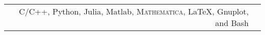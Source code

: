 \renewcommand{\arraystretch}{1.1}

	\begin{tabular}{>{}r>{}p{13cm}} 
		C/C++, Python, Julia, Matlab, \textsc{Mathematica}, \LaTeX, Gnuplot, and Bash
	\end{tabular}
